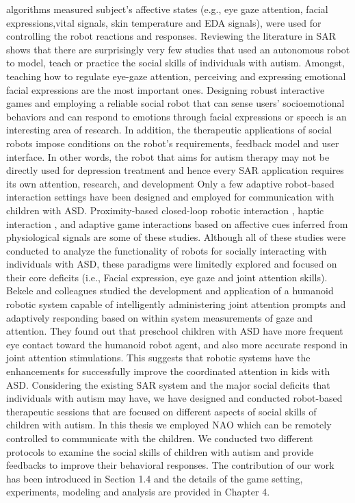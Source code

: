algorithms measured subject’s affective states (e.g., eye gaze attention, facial expressions,vital signals, skin temperature and EDA signals), were used for controlling the robot
reactions and responses.
Reviewing the literature in SAR \cite{DefineSocial2005, SocialInteract2003} shows that there are surprisingly very few
studies that used an autonomous robot to model, teach or practice the social skills of
individuals with autism. Amongst, teaching how to regulate eye-gaze attention, perceiving
and expressing emotional facial expressions are the most important ones. Designing robust
interactive games and employing a reliable social robot that can sense users’ socioemotional
behaviors and can respond to emotions through facial expressions or speech is
an interesting area of research. In addition, the therapeutic applications of social robots
impose conditions on the robot’s requirements, feedback model and user interface. In other
words, the robot that aims for autism therapy may not be directly used for depression
treatment and hence every SAR application requires its own attention, research, and
development
Only a few adaptive robot-based interaction settings have been designed and
employed for communication with children with ASD. Proximity-based closed-loop
robotic interaction \cite{LookApproach1972}, haptic interaction \cite{DiffEffect1966}, and adaptive game interactions based on
affective cues inferred from physiological signals \cite{SysObserv1968} are some of these studies. Although
all of these studies were conducted to analyze the functionality of robots for socially interacting with individuals with ASD, these paradigms were limitedly explored and
focused on their core deficits (i.e., Facial expression, eye gaze and joint attention skills).
Bekele and colleagues \cite{AutisticDist1943} studied the development and application of a humanoid
robotic system capable of intelligently administering joint attention prompts and adaptively
responding based on within system measurements of gaze and attention. They found out
that preschool children with ASD have more frequent eye contact toward the humanoid
robot agent, and also more accurate respond in joint attention stimulations. This suggests
that robotic systems have the enhancements for successfully improve the coordinated
attention in kids with ASD.
Considering the existing SAR system and the major social deficits that individuals
with autism may have, we have designed and conducted robot-based therapeutic sessions
that are focused on different aspects of social skills of children with autism. In this thesis
we employed NAO which can be remotely controlled to communicate with the children.
We conducted two different protocols to examine the social skills of children with autism
and provide feedbacks to improve their behavioral responses. The contribution of our work
has been introduced in Section 1.4 and the details of the game setting, experiments,
modeling and analysis are provided in Chapter 4.

